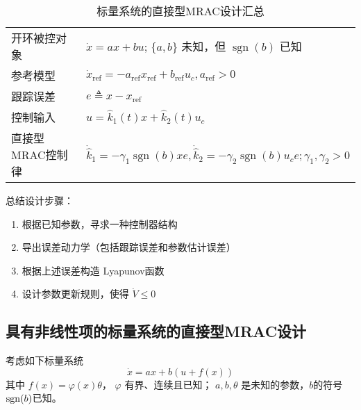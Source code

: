 \begin{table}[htbp]
  \centering
  \setcellgapes{4pt}
  \makegapedcells
  \caption{标量系统的直接型MRAC设计汇总}
  \begin{tabular}{p{4.0cm}p{10.0cm}}
    \hline
    开环被控对象 & $\dot{x} = a  x + b  u$; $\{ a, b \}$ 未知，但
    $\ensuremath{\operatorname{sgn}} (b)$ 已知\\
    参考模型 & $\dot{x}_{\ensuremath{\operatorname{ref}}} = -
    a_{\ensuremath{\operatorname{ref}}} x_{\ensuremath{\operatorname{ref}}} +
    b_{\ensuremath{\operatorname{ref}}} u_c,a_{\ensuremath{\operatorname{ref}}}>0$\\
    跟踪误差 & $e \triangleq x - x_{\ensuremath{\operatorname{ref}}}$\\
    控制输入 & $u = \hat{k}_1 (t) x + \hat{k}_2 (t) u_c$\\
    直接型MRAC控制律& $\dot{\hat{k}}_1 = -  \gamma_1
    \ensuremath{\operatorname{sgn}} (b) x  e, \dot{\hat{k}}_2 = -  \gamma_2
    \ensuremath{\operatorname{sgn}} (b)  u_c e ; \gamma_1, \gamma_2 > 0$\\
    \hline
  \end{tabular}
\end{table}

总结设计步骤：
\begin{enumerate}
  \item 根据已知参数，寻求一种控制器结构
  
  \item 导出误差动力学（包括跟踪误差和参数估计误差）
  
  \item 根据上述误差构造 Lyapunov函数
  
  \item 设计参数更新规则，使得 $\dot{V} \leq 0$
\end{enumerate}
\subsection{具有非线性项的标量系统的直接型MRAC设计}

考虑如下标量系统
\begin{equation}
  \dot{x} = a  x + b  (u + f (x)) \label{Sys:MRAC:nonlinear}
\end{equation}
其中 $f (x) = \varphi (x) \theta$， $\varphi$ 有界、连续且已知； $a, b, \theta$ 是未知的参数，$b$的符号$\operatorname{sgn}(b)$已知。

